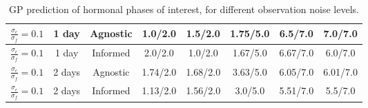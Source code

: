 \begin{table}[!h]
\begin{center}
{\begin{tabular}{*{8}{|c}|}
				$\frac{\sigma_{\epsilon}}{\sigma_{f}}=0.1$ & 1 day & Agnostic & 1.0/2.0 & 1.5/2.0 & 1.75/5.0 & 6.5/7.0 & 7.0/7.0 \\ \hline 
				$\frac{\sigma_{\epsilon}}{\sigma_{f}}=0.1$ & 1 day & Informed  & 2.0/2.0 & 1.0/2.0 & 1.67/5.0 & 6.67/7.0 & 6.0/7.0  \\ \hline 
				$\frac{\sigma_{\epsilon}}{\sigma_{f}}=0.1$ & 2 days & Agnostic & 1.74/2.0 & 1.68/2.0 & 3.63/5.0 & 6.05/7.0 & 6.01/7.0 \\ \hline 
				$\frac{\sigma_{\epsilon}}{\sigma_{f}}=0.1$ & 2 days & Informed & 1.13/2.0 & 1.56/2.0 & 3.0/5.0 & 5.51/7.0 & 5.5/7.0 \\ \hline 
			\end{tabular}
		}
		\vspace*{0.5cm}
		\caption{GP prediction of hormonal phases of interest, for different observation noise levels.}
		\label{tab:event_prediction_noise}
	\end{center}
\end{table}

